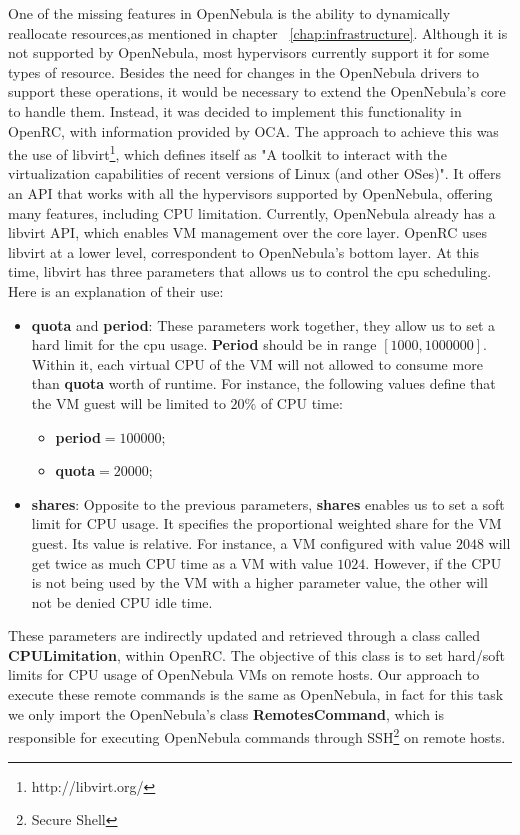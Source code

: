 One of the missing features in OpenNebula is the ability to dynamically reallocate resources,as mentioned in chapter ~\ref{chap:infrastructure}. Although it is not supported by OpenNebula, most hypervisors currently support it for some types of resource. Besides the need for changes in the OpenNebula drivers to support these operations, it would be necessary to extend the OpenNebula's core to handle them. Instead, it was decided to implement this functionality in OpenRC, with information provided by OCA. The approach to achieve this  was the use of libvirt\footnote{http://libvirt.org/}, which defines itself as "A toolkit to interact with the virtualization capabilities of recent versions of Linux (and other OSes)". It offers an API that works with all the hypervisors supported by OpenNebula, offering many features, including CPU limitation. Currently, OpenNebula already has a libvirt API, which enables VM management over the core layer. OpenRC uses libvirt at a lower level, correspondent to OpenNebula's 
bottom layer. At this time, libvirt has three parameters that allows us to control the cpu scheduling. Here is an explanation of their use:
\begin{itemize}
 \item \textbf{quota} and \textbf{period}: These parameters work together, they allow us to set a hard limit for the cpu usage. \textbf{Period} should be in range $[1000, 1000000]$. Within it, each virtual CPU of the VM will not allowed to consume more than \textbf{quota} worth of runtime. For instance, the following values define that the VM guest will be limited to $20\%$ of CPU time:
  \begin{itemize}
   \item  \textbf{period}$=100000$; 
   \item \textbf{quota}$=20000$;
  \end{itemize}
  \item \textbf{shares}: Opposite to the previous parameters, \textbf{shares} enables us to set a soft limit for CPU usage. It specifies the proportional weighted share for the VM guest. Its value is relative. For instance, a VM configured with value $2048$ will get twice as much CPU time as a VM with value $1024$. However, if the CPU is not being used by the VM with a higher parameter value, the other will not be denied CPU idle time.
\end{itemize}

These parameters are indirectly updated and retrieved through a class called \textbf{CPULimitation}, within OpenRC. The objective of this class is to set hard/soft limits for CPU usage of OpenNebula VMs on remote hosts. Our approach to execute these remote commands  is the same as OpenNebula, in fact for this task we only import the OpenNebula's class \textbf{RemotesCommand}, which is responsible for executing OpenNebula commands through SSH\footnote{Secure Shell} on remote hosts.


